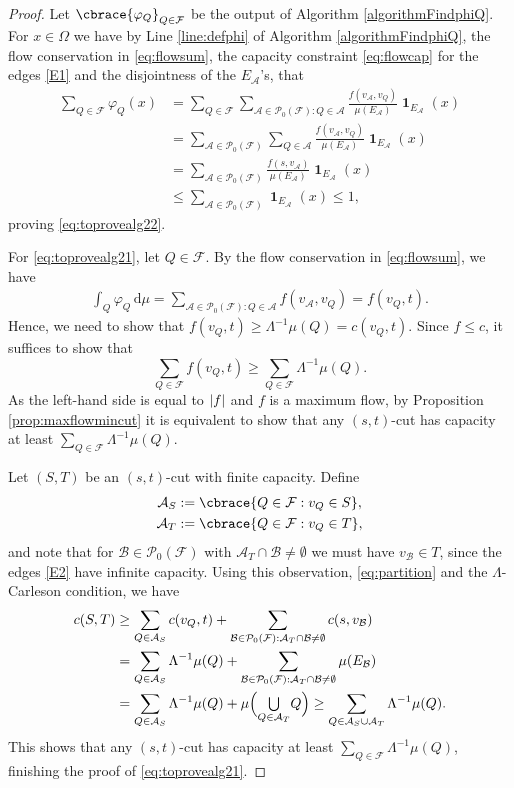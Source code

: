 \documentclass[a4paper, oneside,11pt]{amsart}
\theoremstyle{definition}
\theoremstyle{remark}
\numberwithin{equation}{section}
\newcommand{\mc}{\mathcal}
\DeclarePairedDelimiter\abs{\lvert}{\rvert}
\DeclarePairedDelimiter\cbrace\{\}
\newcommand{\bcup}[1]{{\textstyle\bigcup\limits_{#1}}}
\newcommand{\has}[1]{\Bigl(#1\Bigr)}
\newcommand{\dd}{\hspace{2pt}\mathrm{d}}
\DeclareMathOperator{\ind}{\mathbf{1}}
\begin{document}
\begin{proof}
Let $\cbrace{\varphi_Q}_{Q \in \mc{F}}$ be the output of Algorithm \ref{algorithmFindphiQ}.
For $x \in \Omega$ we have by Line \ref{line:defphi} of Algorithm \ref{algorithmFindphiQ}, the flow conservation in \eqref{eq:flowsum}, the capacity constraint \eqref{eq:flowcap} for the edges \ref{E1} and the disjointness of the $E_{\mc{A}}$'s, that
\begin{align*}
  \sum_{Q \in \mc{F}}\varphi_Q(x) &= \sum_{Q \in \mc{F}}\sum_{\mc{A} \in \mc{P}_0(\mc{F}): Q \in \mc{A}} \frac{f(v_{\mc{A}},v_Q)}{\mu(E_{\mc{A}})}\ind_{E_{\mc{A}}}(x)\\
  &= \sum_{\mc{A} \in \mc{P}_0(\mc{F})}\sum_{Q \in \mc{A}} \frac{f(v_{\mc{A}},v_Q)}{\mu(E_{\mc{A}})}\ind_{E_{\mc{A}}}(x)\\
  &= \sum_{\mc{A} \in \mc{P}_0(\mc{F})} \frac{f(s,v_{\mc{A}})}{\mu(E_{\mc{A}})}\ind_{E_{\mc{A}}}(x)\\
  &\leq \sum_{\mc{A} \in \mc{P}_0(\mc{F})} \ind_{E_{\mc{A}}}(x) \leq 1,
\end{align*}
proving \eqref{eq:toprovealg22}.

For \eqref{eq:toprovealg21}, let  $Q \in \mc{F}$. By the flow conservation in \eqref{eq:flowsum}, we have
\begin{align*}
  \int_Q \varphi_Q\dd \mu = \sum_{\mc{A} \in \mc{P}_0(\mc{F}): Q \in \mc{A}} f(v_{\mc{A}},v_Q) = f(v_Q,t).
\end{align*}
Hence, we need to show that
$f(v_Q,t) \geq \Lambda^{-1}\mu(Q) = c(v_Q,t)$. Since $f \leq c$,  it suffices to show that
$$
\sum_{Q \in \mc{F}} f(v_Q,t) \geq \sum_{Q\in \mc{F}} \Lambda^{-1}\mu(Q).
$$
As the left-hand side is equal to $\abs{f}$ and $f$ is a maximum flow, by Proposition \ref{prop:maxflowmincut} it is equivalent to show that any $(s,t)$-cut  has capacity at least $\sum_{Q\in \mc{F}} \Lambda^{-1}\mu(Q)$.

Let $(S,T)$ be an $(s,t)$-cut with finite capacity. Define \begin{align*}
  \mc{A}_S&:=\cbrace{Q\in \mc{F}:v_Q \in S},\\
  \mc{A}_T&:=\cbrace{Q\in \mc{F}:v_Q \in T},
\end{align*} and note that for $\mc{B} \in \mc{P}_0(\mc{F})$ with $\mc{A}_T\cap \mc{B} \neq \emptyset$ we must have $v_{\mc{B}} \in T$, since the edges \ref{E2} have infinite capacity. Using this observation, \eqref{eq:partition} and the $\Lambda$-Carleson condition, we have
\begin{align*}
c(S,T) &\geq \sum_{Q \in \mc{A}_S} c(v_Q,t) + \sum_{\mc{B} \in \mc{P}_0(\mc{F}):\mc{A}_T\cap \mc{B} \neq \emptyset}  c(s,v_{\mc{B}})\\
&= \sum_{Q \in \mc{A}_S}\Lambda^{-1}\mu(Q) + \sum_{\mc{B} \in \mc{P}_0(\mc{F}):\mc{A}_T\cap \mc{B} \neq \emptyset}  \mu(E_{\mc{B}})\\
&= \sum_{Q \in \mc{A}_S} \Lambda^{-1}\mu(Q) + \mu \has{\bcup{Q \in \mc{A}_T} Q}\geq \sum_{Q \in \mc{A}_S\cup \mc{A}_T} \Lambda^{-1}\mu(Q).
\end{align*}
This shows that any $(s,t)$-cut has capacity at least $\sum_{Q\in \mc{F}} \Lambda^{-1}\mu(Q)$, finishing the proof of
\eqref{eq:toprovealg21}.


\end{proof}
\end{document}
